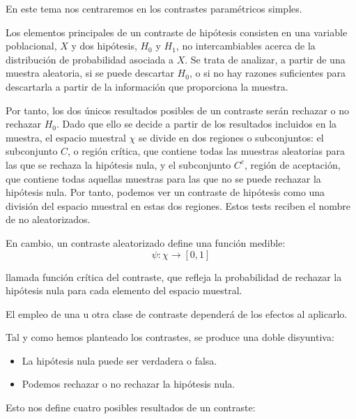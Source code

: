 En este tema nos centraremos en los contrastes param\'etricos simples.


Los elementos principales de un contraste de hip\'otesis consisten en una variable poblacional, $X$ y dos hip\'otesis, $H_0$ y $H_1$, no intercambiables acerca de la distribuci\'on de probabilidad asociada a $X$. Se trata de analizar, a partir de una muestra aleatoria, si se puede descartar $H_0$, o si no hay razones suficientes para descartarla a partir de la informaci\'on que proporciona la muestra.

Por tanto, los dos \'unicos resultados posibles de un contraste ser\'an rechazar o no rechazar $H_0$. Dado que ello se decide a partir de los resultados incluidos en la muestra, el espacio muestral $\chi$ se divide en dos regiones o subconjuntos: el subconjunto $C$, o regi\'on cr\'itica, que contiene todas las muestras aleatorias para las que se rechaza la hip\'otesis nula, y el subconjunto $C^c$, regi\'on de aceptaci\'on, que contiene todas aquellas muestras para las que no se puede rechazar la hip\'otesis nula. Por tanto, podemos ver un contraste de hip\'otesis como una divisi\'on del espacio muestral en estas dos regiones. Estos tests reciben el nombre de no aleatorizados.

En cambio, un contraste aleatorizado define una funci\'on medible:
\begin{equation*}
\psi :\chi\to[0,1]
\end{equation*}

llamada funci\'on cr\'itica del contraste, que refleja la probabilidad de rechazar la hip\'otesis nula para cada elemento del espacio muestral.

El empleo de una u otra clase de contraste depender\'a de los efectos al aplicarlo.


Tal y como hemos planteado los contrastes, se produce una doble disyuntiva:
\begin{itemize}
\item La hip\'otesis nula puede ser verdadera o falsa.
\item Podemos rechazar o no rechazar la hip\'otesis nula.
\end{itemize}

Esto nos define cuatro posibles resultados de un contraste:

